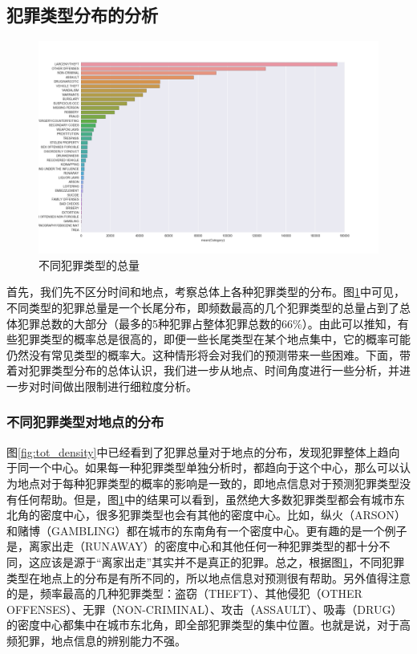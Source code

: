 \subsection{犯罪类型分布的分析}

\begin{figure}[tb]
    \centering
    \includegraphics[width=1.0\linewidth]{fig/category}
    \caption{不同犯罪类型的总量}
    \label{fig:tot_category}
\end{figure}

首先，我们先不区分时间和地点，考察总体上各种犯罪类型的分布。图\ref{fig:tot_category}中可见，不同类型的犯罪总量是一个长尾分布，即频数最高的几个犯罪类型的总量占到了总体犯罪总数的大部分（最多的5种犯罪占整体犯罪总数的66\%）。由此可以推知，有些犯罪类型的概率总是很高的，即便一些长尾类型在某个地点集中，它的概率可能仍然没有常见类型的概率大。这种情形将会对我们的预测带来一些困难。下面，带着对犯罪类型分布的总体认识，我们进一步从地点、时间角度进行一些分析，并进一步对时间做出限制进行细粒度分析。

\subsubsection{不同犯罪类型对地点的分布}

图\ref{fig:tot_density}中已经看到了犯罪总量对于地点的分布，发现犯罪整体上趋向于同一个中心。如果每一种犯罪类型单独分析时，都趋向于这个中心，那么可以认为地点对于每种犯罪类型的概率的影响是一致的，即地点信息对于预测犯罪类型没有任何帮助。但是，图\ref{fig:tot_category}中的结果可以看到，虽然绝大多数犯罪类型都会有城市东北角的密度中心，很多犯罪类型也会有其他的密度中心。比如，纵火（ARSON）和赌博（GAMBLING）都在城市的东南角有一个密度中心。更有趣的是一个例子是，离家出走（RUNAWAY）的密度中心和其他任何一种犯罪类型的都十分不同，这应该是源于“离家出走”其实并不是真正的犯罪。总之，根据图\ref{fig:tot_category}，不同犯罪类型在地点上的分布是有所不同的，所以地点信息对预测很有帮助。另外值得注意的是，频率最高的几种犯罪类型：盗窃（THEFT）、其他侵犯（OTHER OFFENSES）、无罪（NON-CRIMINAL）、攻击（ASSAULT）、吸毒（DRUG）的密度中心都集中在城市东北角，即全部犯罪类型的集中位置。也就是说，对于高频犯罪，地点信息的辨别能力不强。

